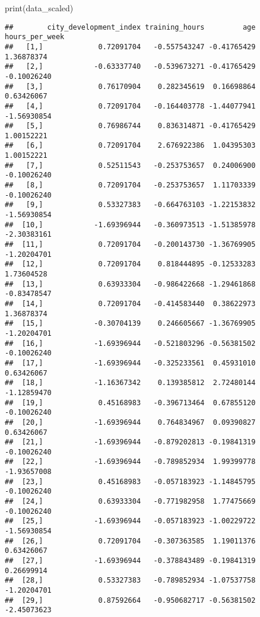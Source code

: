 \documentclass[
]{article}
\newenvironment{Shaded}{\begin{snugshade}}{\end{snugshade}}
\newcommand{\FunctionTok}[1]{\textcolor[rgb]{0.00,0.00,0.00}{#1}}
\newcommand{\NormalTok}[1]{#1}
\begin{document}
\begin{Shaded}
\begin{Highlighting}[]
\FunctionTok{print}\NormalTok{(data\_scaled)}
\end{Highlighting}
\end{Shaded}

\begin{verbatim}
##        city_development_index training_hours         age hours_per_week
##   [1,]             0.72091704   -0.557543247 -0.41765429     1.36878374
##   [2,]            -0.63337740   -0.539673271 -0.41765429    -0.10026240
##   [3,]             0.76170904    0.282345619  0.16698864     0.63426067
##   [4,]             0.72091704   -0.164403778 -1.44077941    -1.56930854
##   [5,]             0.76986744    0.836314871 -0.41765429     1.00152221
##   [6,]             0.72091704    2.676922386  1.04395303     1.00152221
##   [7,]             0.52511543   -0.253753657  0.24006900    -0.10026240
##   [8,]             0.72091704   -0.253753657  1.11703339    -0.10026240
##   [9,]             0.53327383   -0.664763103 -1.22153832    -1.56930854
##  [10,]            -1.69396944   -0.360973513 -1.51385978    -2.30383161
##  [11,]             0.72091704   -0.200143730 -1.36769905    -1.20204701
##  [12,]             0.72091704    0.818444895 -0.12533283     1.73604528
##  [13,]             0.63933304   -0.986422668 -1.29461868    -0.83478547
##  [14,]             0.72091704   -0.414583440  0.38622973     1.36878374
##  [15,]            -0.30704139    0.246605667 -1.36769905    -1.20204701
##  [16,]            -1.69396944   -0.521803296 -0.56381502    -0.10026240
##  [17,]            -1.69396944   -0.325233561  0.45931010     0.63426067
##  [18,]            -1.16367342    0.139385812  2.72480144    -1.12859470
##  [19,]             0.45168983   -0.396713464  0.67855120    -0.10026240
##  [20,]            -1.69396944    0.764834967  0.09390827     0.63426067
##  [21,]            -1.69396944   -0.879202813 -0.19841319    -0.10026240
##  [22,]            -1.69396944   -0.789852934  1.99399778    -1.93657008
##  [23,]             0.45168983   -0.057183923 -1.14845795    -0.10026240
##  [24,]             0.63933304   -0.771982958  1.77475669    -0.10026240
##  [25,]            -1.69396944   -0.057183923 -1.00229722    -1.56930854
##  [26,]             0.72091704   -0.307363585  1.19011376     0.63426067
##  [27,]            -1.69396944   -0.378843489 -0.19841319     0.26699914
##  [28,]             0.53327383   -0.789852934 -1.07537758    -1.20204701
##  [29,]             0.87592664   -0.950682717 -0.56381502    -2.45073623

\end{verbatim}
\end{document}
